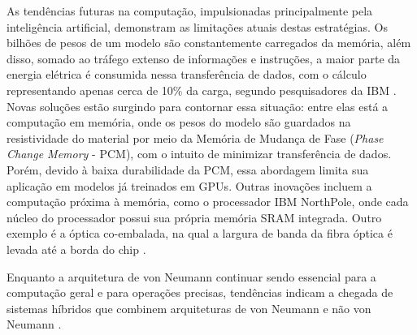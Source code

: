 \documentclass[portuguese]{sbcreviews-2025}%
\begin{document}
As tendências futuras na computação, impulsionadas principalmente pela inteligência artificial, demonstram as limitações atuais destas estratégias. Os bilhões de pesos de um modelo são constantemente carregados da memória, além disso, somado ao tráfego extenso de informações e instruções, a maior parte da energia elétrica é 
consumida nessa transferência de dados, com o cálculo representando apenas cerca de 10\% da carga, segundo pesquisadores da IBM \citep{hess2025}. Novas soluções estão surgindo para contornar essa situação: entre elas está a computação em memória, onde os pesos do modelo são guardados na resistividade do material por meio da 
Memória de Mudança de Fase (\textit{Phase Change Memory} - PCM), com o intuito de minimizar transferência de dados. Porém, devido à baixa durabilidade da PCM, essa abordagem limita sua aplicação em modelos já treinados em GPUs. Outras inovações incluem a computação próxima à memória, como o processador IBM NorthPole, onde cada 
núcleo do processador possui sua própria memória SRAM integrada. Outro exemplo é a óptica co-embalada, na qual a largura de banda da fibra óptica é levada até a borda do chip \citep{hess2025}. 

Enquanto a arquitetura de von Neumann continuar sendo essencial para a computação geral e para operações precisas, tendências indicam a chegada de sistemas híbridos que combinem arquiteturas de von Neumann e não von Neumann \citep{hess2025}.
\end{document}
